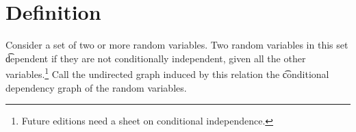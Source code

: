 

\section*{Definition}

Consider a set of two or more random variables.
Two random variables in this set \t{dependent} if they are not conditionally independent, given all the other variables.\footnote{Future editions need a sheet on conditional independence.}
Call the undirected graph induced by this relation the \t{conditional dependency graph} of the random variables.

\blankpage